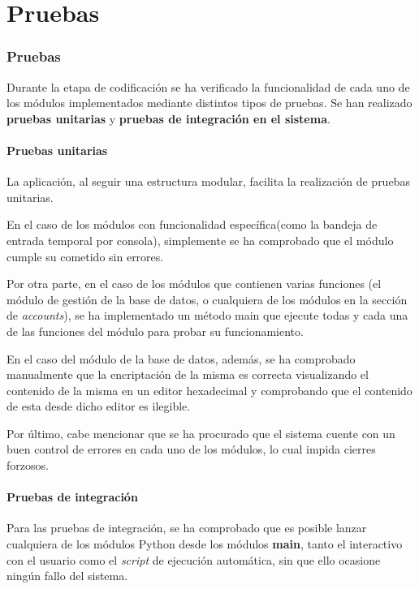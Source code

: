 \chapter{Pruebas}
\label{chap:pruebas}

\subsection{Pruebas}
Durante la etapa de codificación se ha verificado la funcionalidad de cada uno de los módulos implementados mediante distintos tipos de pruebas. 
Se han realizado \textbf{pruebas unitarias} y \textbf{pruebas de integración en el sistema}.

\subsubsection{Pruebas unitarias}

La aplicación, al seguir una estructura modular, facilita la realización de pruebas unitarias.

En el caso de los módulos con funcionalidad específica(como la bandeja de entrada temporal por consola), simplemente se ha comprobado que el módulo cumple su cometido sin errores.

Por otra parte, en el caso de los módulos que contienen varias funciones (el módulo de gestión de la base de datos, o cualquiera de los módulos en la sección de \textit{accounts}), se ha implementado un método main que ejecute todas y cada una de las funciones del módulo para probar su funcionamiento.

En el caso del módulo de la base de datos, además, se ha comprobado manualmente que la encriptación de la misma es correcta visualizando el contenido de la misma en un editor hexadecimal y comprobando que el contenido de esta desde dicho editor es ilegible.

Por último, cabe mencionar que se ha procurado que el sistema cuente con un buen control de errores en cada uno de los módulos, lo cual impida cierres forzosos.

\subsubsection{Pruebas de integración}

Para las pruebas de integración, se ha comprobado que es posible lanzar cualquiera de los módulos Python desde los módulos \textbf{main}, tanto el interactivo con el usuario como el \textit{script} de ejecución automática, sin que ello ocasione ningún fallo del sistema.

